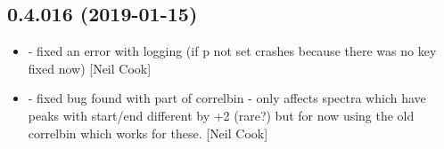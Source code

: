 \documentclass[a4paper,10pt,english]{report}
\begin{document}
\subsection{0.4.016 (2019-01-15)}
\label{\detokenize{misc/changelog:id218}}\begin{itemize}
\item {} 
 - fixed an error with logging (if p not set crashes
because there was no  key \textendash{} fixed now) {[}Neil Cook{]}

\item {} 
 - fixed bug found with part of correlbin - only affects
spectra which have peaks with start/end different by +2 (rare?) but
for now using the old correlbin which works for these. {[}Neil Cook{]}

\end{itemize}
\end{document}
